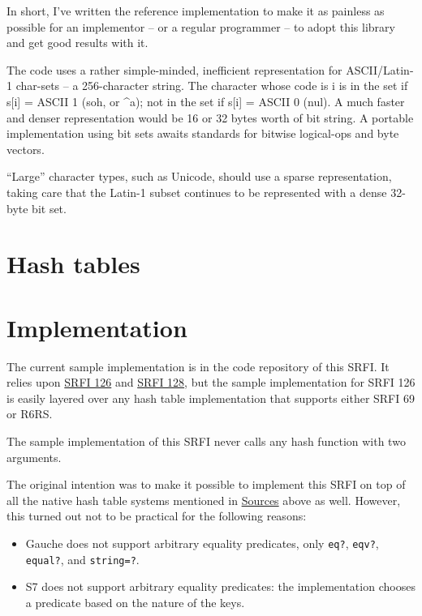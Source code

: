 In short, I've written the reference implementation to make it as
painless as possible for an implementor -- or a regular programmer -- to
adopt this library and get good results with it.

The code uses a rather simple-minded, inefficient representation for
ASCII/Latin-1 char-sets -- a 256-character string. The character whose
code is i is in the set if s{[}i{]} = ASCII 1 (soh, or \^{}a); not in
the set if s{[}i{]} = ASCII 0 (nul). A much faster and denser
representation would be 16 or 32 bytes worth of bit string. A portable
implementation using bit sets awaits standards for bitwise logical-ops
and byte vectors.

``Large'' character types, such as Unicode, should use a sparse
representation, taking care that the Latin-1 subset continues to be
represented with a dense 32-byte bit set.

\section{Hash tables}

\section{Implementation}\label{implementation}

The current sample implementation is in the code repository of this
SRFI. It relies upon
\href{http://srfi.schemers.org/srfi-126/srfi-126.html}{SRFI 126} and
\href{http://srfi.schemers.org/srfi-128/srfi-128.html}{SRFI 128}, but
the sample implementation for SRFI 126 is easily layered over any hash
table implementation that supports either SRFI 69 or R6RS.

The sample implementation of this SRFI never calls any hash function
with two arguments.

The original intention was to make it possible to implement this SRFI on
top of all the native hash table systems mentioned in
\href{http://srfi.schemers.org/srfi-125/srfi-125.html\#Sources}{Sources}
above as well. However, this turned out not to be practical for the
following reasons:

\begin{itemize}
\tightlist
\item
  Gauche does not support arbitrary equality predicates, only
  \texttt{eq?}, \texttt{eqv?}, \texttt{equal?}, and \texttt{string=?}.
\end{itemize}

\begin{itemize}
\tightlist
\item
  S7 does not support arbitrary equality predicates: the implementation
  chooses a predicate based on the nature of the keys.
\end{itemize}

